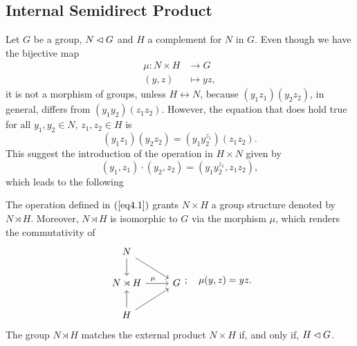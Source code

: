 \subsection*{Internal Semidirect Product} Let $G$ be a group, $N\lhd G$ and $H$ a complement for $N$ in $G$. Even though we have the bijective map
\begin{align*}
    \mu\colon N\times H&\to G\\
    (y,z)&\mapsto yz,
\end{align*}
it is not a morphism of groups, unless $H\leftrightarrow N$, because $(y_1z_1)(y_2z_2)$, in general, differs from $(y_1y_2)(z_1z_2)$. However, the equation that does hold true for all $y_1,y_2\in N$, $z_1,z_2\in H$ is
\begin{equation}\label{eq4}
    (y_1z_1)(y_2z_2) = (y_1y_2^{z_1})(z_1z_2).
\end{equation}
This suggest the introduction of the operation in $H\times N$ given by
\begin{equation}\label{eq4.1}
    (y_1,z_1)\cdot(y_2,z_2) = (y_1y_2^{z_1},z_1z_2),
\end{equation}
which leads to the following
\begin{thm}\label{internal-semidirect-product}
    The operation defined in\/ $(\ref{eq4.1})$ grants\/ $N\times H$ a group structure denoted by $N\rtimes H$. Moreover, $N\rtimes H$ is isomorphic to\/ $G$ via the morphism $\mu$, which renders the commutativity of
    $$
    \begin{tikzcd}
        N\arrow[rd]\arrow[d]\\
        N\rtimes H\arrow[r, "\hspace{-0.3cm}\mu"]&G\\
        H\arrow[ru]\arrow[u]
    \end{tikzcd};\quad\mu(y,z)=yz.
    $$
    The group $N\rtimes H$ matches the external product $N\times H$ if, and only if, $H\lhd G$.
\end{thm}

